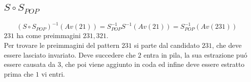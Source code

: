 \subsection*{$S\circ{S_{POP}}$}
$$(S\circ{S_{POP}})^{-1}(Av(21))=S_{POP}^{-1}S^{-1}(Av(21))=S_{POP}^{-1}(Av(231))$$
$231$ ha come preimmagini $231,321$.\\
Per trovare le preimmagini del pattern $231$ si parte dal candidato $231$, che deve essere lasciato invariato. Deve succedere che $2$ entra in pila, la sua estrazione pu\'o essere causata da $3$, che poi viene aggiunto in coda ed infine deve essere estratto prima che $1$ vi entri.